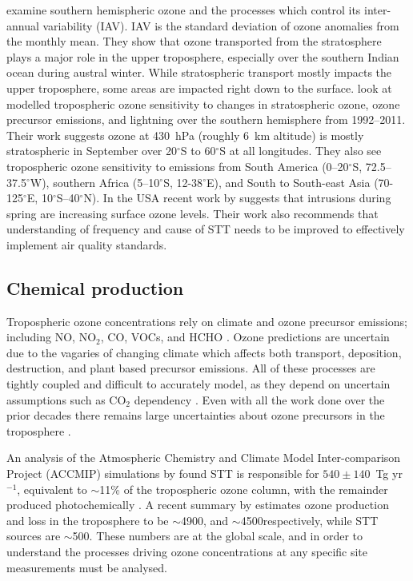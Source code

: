    \cite{Liu2017} examine southern hemispheric ozone and the processes which control its inter-annual variability (IAV).
    IAV is the standard deviation of ozone anomalies from the monthly mean.
    They show that ozone transported from the stratosphere plays a major role in the upper troposphere, especially over the southern Indian ocean during austral winter.
    While stratospheric transport mostly impacts the upper troposphere, some areas are impacted right down to the surface.
    \cite{Liu2017} look at modelled tropospheric ozone sensitivity to changes in stratospheric ozone, ozone precursor emissions, and lightning over the southern hemisphere from 1992--2011. 
    Their work suggests ozone at 430~hPa (roughly 6~km altitude) is mostly stratospheric in September over 20$^{\circ}$S to 60$^{\circ}$S at all longitudes.
    They also see tropospheric ozone sensitivity to emissions from South America (0--20$^{\circ}$S, 72.5--37.5$^{\circ}$W), southern Africa (5--10$^{\circ}$S, 12-38$^{\circ}$E), and South to South-east Asia (70-125$^{\circ}$E, 10$^{\circ}$S--40$^{\circ}$N).
    In the USA recent work by \cite{Lin2015} suggests that intrusions during spring are increasing surface ozone levels.
    Their work also recommends that understanding of frequency and cause of STT needs to be improved to effectively implement air quality standards.
    
    
  \subsection{Chemical production}
    
    Tropospheric ozone concentrations rely on climate and ozone precursor emissions; including NO, NO$_2$, CO, VOCs, and HCHO \citep{Atkinson2000, Young2013, Marvin2017}. 
    Ozone predictions are uncertain due to the vagaries of changing climate which affects both transport, deposition, destruction, and plant based precursor emissions.
    All of these processes are tightly coupled and difficult to accurately model, as they depend on uncertain assumptions such as CO$_2$ dependency \citep{Young2013}.
    Even with all the work done over the prior decades there remains large uncertainties about ozone precursors in the troposphere \citep{Mazzuca2016}.
    
    An analysis of the Atmospheric Chemistry and Climate Model Inter-comparison Project (ACCMIP) simulations by \cite{Young2013} found STT is responsible for $540\pm140$~Tg yr$^{-1}$, equivalent to $\sim$11\% of the tropospheric ozone column, with the remainder produced photochemically \citep{Monks2015}.
    A recent summary by \cite{Young2018} estimates ozone production and loss in the troposphere to be $\sim$4900\tgpyr, and $\sim$4500\tgpyr respectively, while STT sources are $\sim$500\tgpyr. 
    These numbers are at the global scale, and in order to understand the processes driving ozone concentrations at any specific site measurements must be analysed.
    
